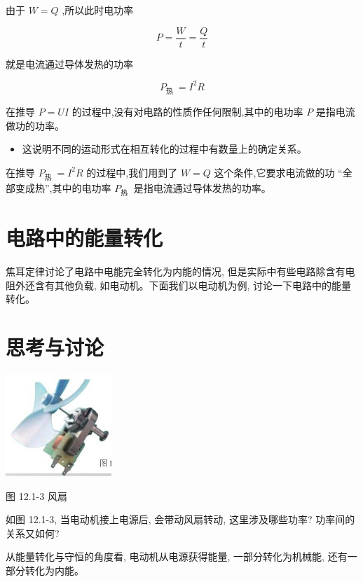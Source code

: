 \documentclass[10pt]{article}
\begin{document}
由于 \(W = Q\) ,所以此时电功率

\[
P = \frac{W}{t} = \frac{Q}{t}
\]

就是电流通过导体发热的功率

\[
{P}_{\text{热 }} = {I}^{2}R
\]

在推导 \(P = {UI}\) 的过程中,没有对电路的性质作任何限制,其中的电功率 \(P\) 是指电流做功的功率。

\begin{mdframed}

\begin{itemize}
\item 这说明不同的运动形式在相互转化的过程中有数量上的确定关系。
\end{itemize}

\end{mdframed}

在推导 \({P}_{\text{热 }} = {I}^{2}R\) 的过程中,我们用到了 \(W = Q\) 这个条件,它要求电流做的功 “全部变成热”,其中的电功率 \({P}_{\text{热 }}\) 是指电流通过导体发热的功率。

\section*{电路中的能量转化}

焦耳定律讨论了电路中电能完全转化为内能的情况, 但是实际中有些电路除含有电阻外还含有其他负载, 如电动机。下面我们以电动机为例, 讨论一下电路中的能量转化。

\section*{思考与讨论}

\begin{center}
\includegraphics[max width=0.3\textwidth]{images/01911d5f-8e38-70c0-b5b8-2b399bd115b6_86_594343.jpg}
\end{center}

图 12.1-3 风扇

如图 12.1-3, 当电动机接上电源后, 会带动风扇转动, 这里涉及哪些功率? 功率间的关系又如何?

从能量转化与守恒的角度看, 电动机从电源获得能量, 一部分转化为机械能, 还有一部分转化为内能。
\end{document}
